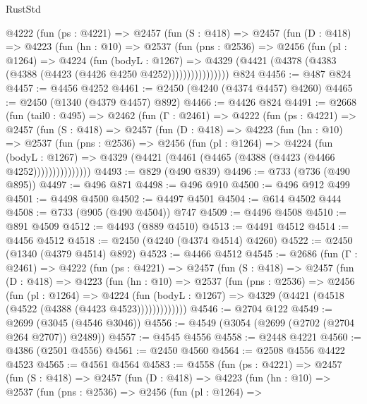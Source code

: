\begin{lexlean}{RustStd}
\begin{coremodule}
        @4222
          (fun (ps : @4221) =>
          @2457
            (fun (S : @418) =>
            @2457
              (fun (D : @418) =>
              @4223
                (fun (hn : @10) =>
                @2537
                  (fun (pns : @2536) =>
                  @2456
                    (fun (pl : @1264) =>
                    @4224
                      (fun (bodyL : @1267) =>
                      @4329 (@4421 (@4378 (@4383 (@4388 (@4423 (@4426 @4250 @4252))))))))))))))))
    @824
@4456 := @487 @824
@4457 := @4456 @4252
@4461 := @2450 (@4240 (@4374 @4457) @4260)
@4465 := @2450 (@1340 (@4379 @4457) @892)
@4466 := @4426 @824
@4491 := @2668
    (fun (tail0 : @495) =>
    @2462
      (fun (Γ : @2461) =>
      @4222
        (fun (ps : @4221) =>
        @2457
          (fun (S : @418) =>
          @2457
            (fun (D : @418) =>
            @4223
              (fun (hn : @10) =>
              @2537
                (fun (pns : @2536) =>
                @2456
                  (fun (pl : @1264) =>
                  @4224
                    (fun (bodyL : @1267) =>
                    @4329 (@4421 (@4461 (@4465 (@4388 (@4423 (@4466 @4252)))))))))))))))
@4493 := @829 (@490 @839)
@4496 := @733 (@736 (@490 @895))
@4497 := @496 @871
@4498 := @496 @910
@4500 := @496 @912 @499
@4501 := @4498 @4500
@4502 := @4497 @4501
@4504 := @614 @4502 @444
@4508 := @733 (@905 (@490 @4504)) @747
@4509 := @4496 @4508
@4510 := @891 @4509
@4512 := @4493 (@889 @4510)
@4513 := @4491 @4512
@4514 := @4456 @4512
@4518 := @2450 (@4240 (@4374 @4514) @4260)
@4522 := @2450 (@1340 (@4379 @4514) @892)
@4523 := @4466 @4512
@4545 := @2686
    (fun (Γ : @2461) =>
    @4222
      (fun (ps : @4221) =>
      @2457
        (fun (S : @418) =>
        @2457
          (fun (D : @418) =>
          @4223
            (fun (hn : @10) =>
            @2537
              (fun (pns : @2536) =>
              @2456
                (fun (pl : @1264) =>
                @4224
                  (fun (bodyL : @1267) =>
                  @4329 (@4421 (@4518 (@4522 (@4388 (@4423 @4523)))))))))))))
@4546 := @2704 @122
@4549 := @2699 (@3045 (@4546 @3046))
@4556 := @4549 (@3054 (@2699 (@2702 (@2704 @264 @2707)) @2489))
@4557 := @4545 @4556
@4558 := @2448 @4221
@4560 := @4386 (@2501 @4556)
@4561 := @2450 @4560
@4564 := @2508 @4556 @4422 @4523
@4565 := @4561 @4564
@4583 := @4558
    (fun (ps : @4221) =>
    @2457
      (fun (S : @418) =>
      @2457
        (fun (D : @418) =>
        @4223
          (fun (hn : @10) =>
          @2537
            (fun (pns : @2536) =>
            @2456
              (fun (pl : @1264) =>

\end{coremodule}
\end{lexlean}
